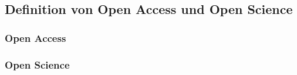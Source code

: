 \subsection{Definition von Open Access und Open Science}
\subsubsection{Open Access}
\subsubsection{Open Science}